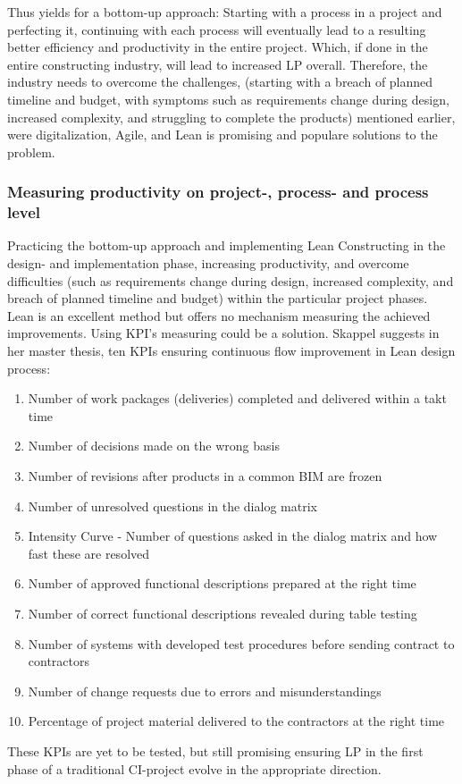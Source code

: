 Thus yields for a bottom-up approach: Starting with a process in a project and perfecting it, continuing with each process will eventually lead to a resulting better efficiency and productivity in the entire project.  Which, if done in the entire constructing industry, will lead to increased LP overall. Therefore, the industry needs to overcome the challenges, (starting with a breach of planned timeline and budget, with symptoms such as requirements change during design, increased complexity, and struggling to complete the products) mentioned earlier, were digitalization, Agile, and Lean is promising and populare solutions to the problem. 

\subsubsection{Measuring productivity on project-, process- and process level}
Practicing the bottom-up approach and implementing Lean Constructing in the design- and implementation phase, increasing productivity, and overcome difficulties (such as requirements change during design, increased complexity, and breach of planned timeline and budget) within the particular project phases. Lean is an excellent method but offers no mechanism measuring the achieved improvements. Using KPI's measuring could be a solution. Skappel \cite{skappel} suggests in her master thesis, ten KPIs ensuring continuous flow improvement in Lean design process: 
\begin{enumerate}
    \item Number of work packages (deliveries) completed and delivered within a takt time
    \item  Number of decisions made on the wrong basis
    \item  Number of revisions after products in a common BIM are frozen
    \item  Number of unresolved questions in the dialog matrix
    \item  Intensity Curve - Number of questions asked in the dialog matrix and how fast these are
    resolved
    \item  Number of approved functional descriptions prepared at the right time
    \item  Number of correct functional descriptions revealed during table testing
    \item  Number of systems with developed test procedures before sending contract to contractors
    \item  Number of change requests due to errors and misunderstandings
    \item  Percentage of project material delivered to the contractors at the right time
\end{enumerate}
These KPIs are yet to be tested, but still promising ensuring LP in the first phase of a traditional CI-project evolve in the appropriate direction. 

